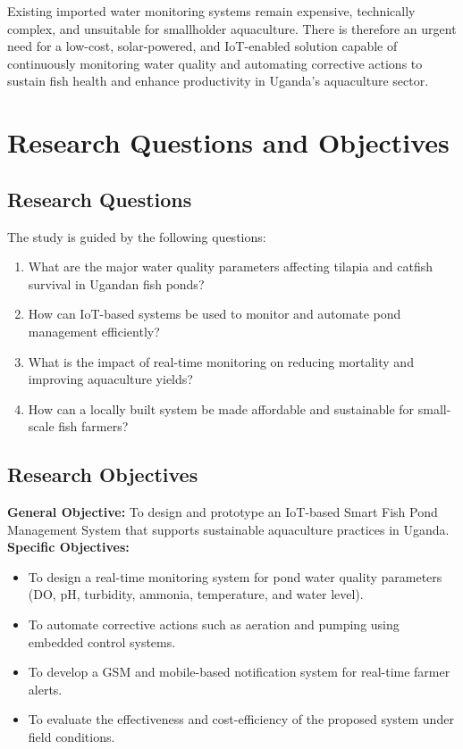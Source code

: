 \documentclass[12pt,a4paper]{report}
\begin{document}
Existing imported water monitoring systems remain expensive, technically complex, and unsuitable for smallholder aquaculture. There is therefore an urgent need for a low-cost, solar-powered, and IoT-enabled solution capable of continuously monitoring water quality and automating corrective actions to sustain fish health and enhance productivity in Uganda’s aquaculture sector.


\section{Research Questions and Objectives}
\subsection{Research Questions}
The study is guided by the following questions:
\begin{enumerate}
    \item What are the major water quality parameters affecting tilapia and catfish survival in Ugandan fish ponds?
    \item How can IoT-based systems be used to monitor and automate pond management efficiently?
    \item What is the impact of real-time monitoring on reducing mortality and improving aquaculture yields?
    \item How can a locally built system be made affordable and sustainable for small-scale fish farmers?
\end{enumerate}

\subsection{Research Objectives}
\textbf{General Objective:}  
To design and prototype an IoT-based Smart Fish Pond Management System that supports sustainable aquaculture practices in Uganda.
\\

\noindent \textbf{Specific Objectives:}
\begin{itemize}
    \item To design a real-time monitoring system for pond water quality parameters (DO, pH, turbidity, ammonia, temperature, and water level).
    \item To automate corrective actions such as aeration and pumping using embedded control systems.
    \item To develop a GSM and mobile-based notification system for real-time farmer alerts.
    \item To evaluate the effectiveness and cost-efficiency of the proposed system under field conditions.
\end{itemize}
\end{document}
